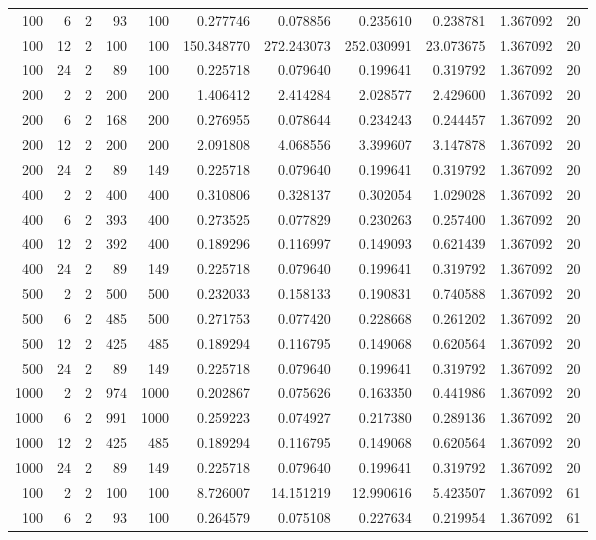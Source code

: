 \begin{table}
\begin{tabular}{rrrrrrrrrrr}
100 & 6 & 2 & 93 & 100 & 0.277746 & 0.078856 & 0.235610 & 0.238781 & 1.367092 & 20 \\
100 & 12 & 2 & 100 & 100 & 150.348770 & 272.243073 & 252.030991 & 23.073675 & 1.367092 & 20 \\
100 & 24 & 2 & 89 & 100 & 0.225718 & 0.079640 & 0.199641 & 0.319792 & 1.367092 & 20 \\
200 & 2 & 2 & 200 & 200 & 1.406412 & 2.414284 & 2.028577 & 2.429600 & 1.367092 & 20 \\
200 & 6 & 2 & 168 & 200 & 0.276955 & 0.078644 & 0.234243 & 0.244457 & 1.367092 & 20 \\
200 & 12 & 2 & 200 & 200 & 2.091808 & 4.068556 & 3.399607 & 3.147878 & 1.367092 & 20 \\
200 & 24 & 2 & 89 & 149 & 0.225718 & 0.079640 & 0.199641 & 0.319792 & 1.367092 & 20 \\
400 & 2 & 2 & 400 & 400 & 0.310806 & 0.328137 & 0.302054 & 1.029028 & 1.367092 & 20 \\
400 & 6 & 2 & 393 & 400 & 0.273525 & 0.077829 & 0.230263 & 0.257400 & 1.367092 & 20 \\
400 & 12 & 2 & 392 & 400 & 0.189296 & 0.116997 & 0.149093 & 0.621439 & 1.367092 & 20 \\
400 & 24 & 2 & 89 & 149 & 0.225718 & 0.079640 & 0.199641 & 0.319792 & 1.367092 & 20 \\
500 & 2 & 2 & 500 & 500 & 0.232033 & 0.158133 & 0.190831 & 0.740588 & 1.367092 & 20 \\
500 & 6 & 2 & 485 & 500 & 0.271753 & 0.077420 & 0.228668 & 0.261202 & 1.367092 & 20 \\
500 & 12 & 2 & 425 & 485 & 0.189294 & 0.116795 & 0.149068 & 0.620564 & 1.367092 & 20 \\
500 & 24 & 2 & 89 & 149 & 0.225718 & 0.079640 & 0.199641 & 0.319792 & 1.367092 & 20 \\
1000 & 2 & 2 & 974 & 1000 & 0.202867 & 0.075626 & 0.163350 & 0.441986 & 1.367092 & 20 \\
1000 & 6 & 2 & 991 & 1000 & 0.259223 & 0.074927 & 0.217380 & 0.289136 & 1.367092 & 20 \\
1000 & 12 & 2 & 425 & 485 & 0.189294 & 0.116795 & 0.149068 & 0.620564 & 1.367092 & 20 \\
1000 & 24 & 2 & 89 & 149 & 0.225718 & 0.079640 & 0.199641 & 0.319792 & 1.367092 & 20 \\
100 & 2 & 2 & 100 & 100 & 8.726007 & 14.151219 & 12.990616 & 5.423507 & 1.367092 & 61 \\
100 & 6 & 2 & 93 & 100 & 0.264579 & 0.075108 & 0.227634 & 0.219954 & 1.367092 & 61 \\

\end{tabular}
\end{table}
